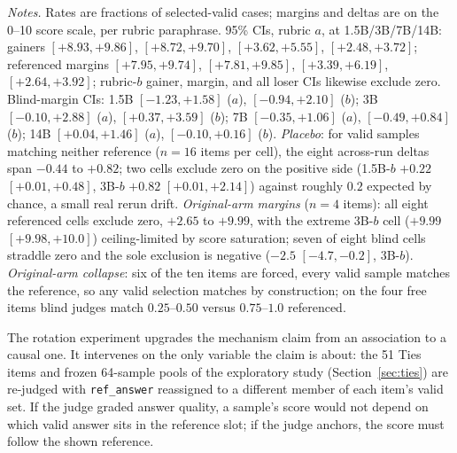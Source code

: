 \documentclass[11pt]{article}
\begin{document}
\begin{table}[tbp]
\medskip
\begin{minipage}{0.97\textwidth}
\footnotesize
\emph{Notes.}
Rates are fractions of selected-valid cases; margins and deltas are on the 0--10 score scale, per rubric paraphrase.
95\% CIs, rubric $a$, at 1.5B/3B/7B/14B: gainers $[+8.93, +9.86]$, $[+8.72, +9.70]$, $[+3.62, +5.55]$, $[+2.48, +3.72]$; referenced margins $[+7.95, +9.74]$, $[+7.81, +9.85]$, $[+3.39, +6.19]$, $[+2.64, +3.92]$; rubric-$b$ gainer, margin, and all loser CIs likewise exclude zero.
Blind-margin CIs: 1.5B $[-1.23, +1.58]$ ($a$), $[-0.94, +2.10]$ ($b$); 3B $[-0.10, +2.88]$ ($a$), $[+0.37, +3.59]$ ($b$); 7B $[-0.35, +1.06]$ ($a$), $[-0.49, +0.84]$ ($b$); 14B $[+0.04, +1.46]$ ($a$), $[-0.10, +0.16]$ ($b$).
\emph{Placebo}: for valid samples matching neither reference ($n{=}16$ items per cell), the eight across-run deltas span $-0.44$ to $+0.82$; two cells exclude zero on the positive side (1.5B-$b$ $+0.22$ $[+0.01, +0.48]$, 3B-$b$ $+0.82$ $[+0.01, +2.14]$) against roughly $0.2$ expected by chance, a small real rerun drift.
\emph{Original-arm margins} ($n{=}4$ items): all eight referenced cells exclude zero, $+2.65$ to $+9.99$, with the extreme 3B-$b$ cell ($+9.99$ $[+9.98, +10.0]$) ceiling-limited by score saturation; seven of eight blind cells straddle zero and the sole exclusion is negative ($-2.5$ $[-4.7, -0.2]$, 3B-$b$).
\emph{Original-arm collapse}: six of the ten items are forced, every valid sample matches the reference, so any valid selection matches by construction; on the four free items blind judges match $0.25$--$0.50$ versus $0.75$--$1.0$ referenced.
\end{minipage}
\caption{\textbf{Takeaway: the identical sample text gains up to $+9.5$ of 10 points when the rotated reference matches it, samples matching the displaced reference lose a roughly symmetric amount, blind margins on the same split are mostly null, and whenever a matching answer is on offer the referenced judge selects it nearly always.}}
\label{tab:rot}
\end{table}

The rotation experiment upgrades the mechanism claim from an association to a causal one.
It intervenes on the only variable the claim is about: the 51 Ties items and frozen 64-sample pools of the exploratory study (Section~\ref{sec:ties}) are re-judged with \texttt{ref\_answer} reassigned to a different member of each item's valid set.
If the judge graded answer quality, a sample's score would not depend on which valid answer sits in the reference slot; if the judge anchors, the score must follow the shown reference.
\end{document}
